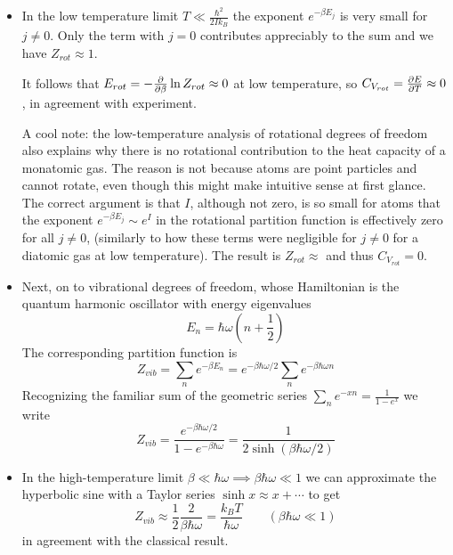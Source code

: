 \documentclass[11pt, a4paper]{article}
\begin{document}
\begin{itemize}
	\item In the low temperature limit $ T \ll \frac{\hbar^{2}}{2Ik_{B}} $ the exponent $ e^{-\beta E_{j}} $ is very small for $ j \neq 0 $. Only the term with $ j = 0 $ contributes appreciably to the sum and we have $ Z_{rot} \approx 1 $.
	
	It follows that $ E_{rot} = -\pdv{}{\beta}\ln Z_{rot} \approx 0 $ at low temperature, so $ C_{V_{rot}} = \pdv{E}{T} \approx 0 $, in agreement with experiment.
	
	A cool note: the low-temperature analysis of rotational degrees of freedom also explains why there is no rotational contribution to the heat capacity of a monatomic gas. The reason is not because atoms are point particles and cannot rotate, even though this might make intuitive sense at first glance. The correct argument is that $ I $, although not zero, is so small for atoms that the exponent $ e^{-\beta E_{j}} \sim e^{I} $ in the rotational partition function is effectively zero for all $ j \neq 0 $, (similarly to how these terms were negligible for $ j \neq 0 $ for a diatomic gas at low temperature). The result is $ Z_{rot} \approx $ and thus $ C_{V_{rot}} = 0 $.
	
	\item Next, on to vibrational degrees of freedom, whose Hamiltonian is the quantum harmonic oscillator with energy eigenvalues
	\begin{equation*}
		E_{n} = \hbar \omega \left(n + \frac{1}{2}\right)
	\end{equation*}
	The corresponding partition function is
	\begin{equation*}
		Z_{vib} = \sum_{n} e^{-\beta E_{n}} = e^{-\beta \hbar \omega /2 } \sum_{n} e^{-\beta \hbar \omega n }
	\end{equation*}
	Recognizing the familiar sum of the geometric series $ \sum_{n}e^{-xn} = \frac{1}{1-e^{x}}$ we write
	\begin{equation*}
		Z_{vib} = \frac{e^{-\beta \hbar \omega /2 }}{1 - e^{-\beta \hbar \omega }} = \frac{1}{2 \sinh(\beta \hbar \omega / 2)}
	\end{equation*}
	
	\item In the high-temperature limit $ \beta \ll \hbar \omega \implies \beta \hbar \omega \ll 1$  we can approximate the hyperbolic sine with a Taylor series $ \sinh x \approx x + \cdots $ to get
	\begin{equation*}
		Z_{vib} \approx \frac{1}{2} \frac{2}{\beta \hbar \omega} = \frac{k_{B}T}{\hbar \omega} \qquad (\beta \hbar \omega \ll 1)
	\end{equation*}
	in agreement with the classical result.
	

\end{itemize}
\end{document}
